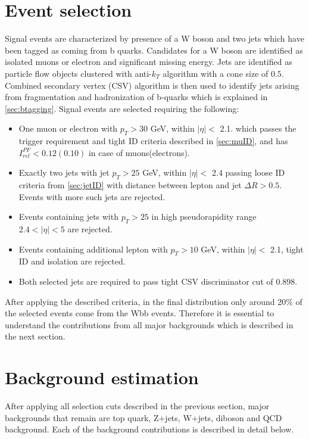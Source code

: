 \section{Event selection}
\label{sec:selection}
Signal events are characterized by presence of a W boson and two jets which have been tagged as coming from b quarks. 
Candidates for a W boson are identified as isolated muons or electron and significant missing energy. 
Jets are identified as particle flow objects clustered with anti-$k_T$ algorithm with a cone size of $0.5$.
Combined secondary vertex (CSV) algorithm is then used to identify jets arising from fragmentation and hadronization of b-quarks which is explained in \ref{sec:btagging}. Signal events are selected requiring the following:
\begin{itemize}
\item One muon or electron with $p_T>30$ GeV, within $|\eta|<$ 2.1. which passes the trigger requirement and tight ID criteria described in \ref{sec:muID}, and has $I_{rel}^{PF}<0.12(0.10)$ in case of muons(electrons).
\item Exactly two jets with jet $p_T>25$ GeV, within $|\eta|<$ 2.4 passing loose ID criteria from \ref{sec:jetID} with distance between lepton and jet $\Delta R>0.5$. Events with more such jets are rejected.
\item Events containing jets with $p_T>25$ in high pseudorapidity range $2.4<|\eta|<5$ are rejected.
\item Events containing additional lepton with $p_T>10$ GeV, within $|\eta|<$ 2.1, tight ID and isolation are rejected.
\item Both selected jets are required to pass tight CSV discriminator cut of 0.898.
\end{itemize} 

After applying the described criteria, in the final distribution only around 20$\%$ of the selected events come from the Wbb events. Therefore it is essential to understand the contributions from all major backgrounds which is described in the next section. 

\section{Background estimation}

After applying all selection cuts described in the previous section, major backgrounds that remain are top quark, Z+jets, W+jets, diboson and QCD background. Each of the background contributions is described in detail below. 


